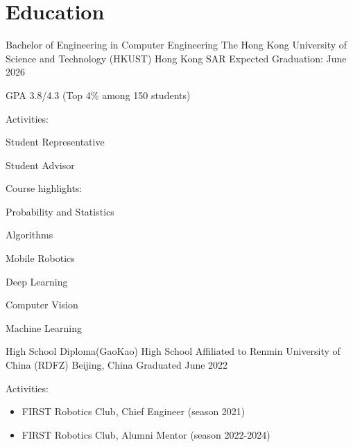 \vspace{-\acvSectionTopSkip}
\section{Education}
\cventry
{Bachelor of Engineering in Computer Engineering} %
{The Hong Kong University of Science and Technology (HKUST)} %
{Hong Kong SAR} %
{Expected Graduation: June 2026} %
\begin{cvitems}
    \item {GPA 3.8/4.3 (Top 4\% among 150 students)}
    \item {Activities:}
        \begin{itemize}
            \begin{multicols}{2}
                \item Student Representative
                \item Student Advisor
            \end{multicols}
        \end{itemize}
    \item {Course highlights:}
        \begin{itemize}
            \begin{multicols}{2}
                \item Probability and Statistics
                \item Algorithms
                \item Mobile Robotics
                \item Deep Learning
                \item Computer Vision
                \item Machine Learning
            \end{multicols}
        \end{itemize}
\end{cvitems}

\cventry
{High School Diploma(GaoKao)} %
{High School Affiliated to Renmin University of China (RDFZ)} %
{Beijing, China} %
{Graduated June 2022} %
\begin{cvitems}
\item {Activities:}
\begin{itemize}
    \item FIRST Robotics Club, Chief Engineer (season 2021)
    \item FIRST Robotics Club, Alumni Mentor (season 2022-2024)
\end{itemize}
\end{cvitems}